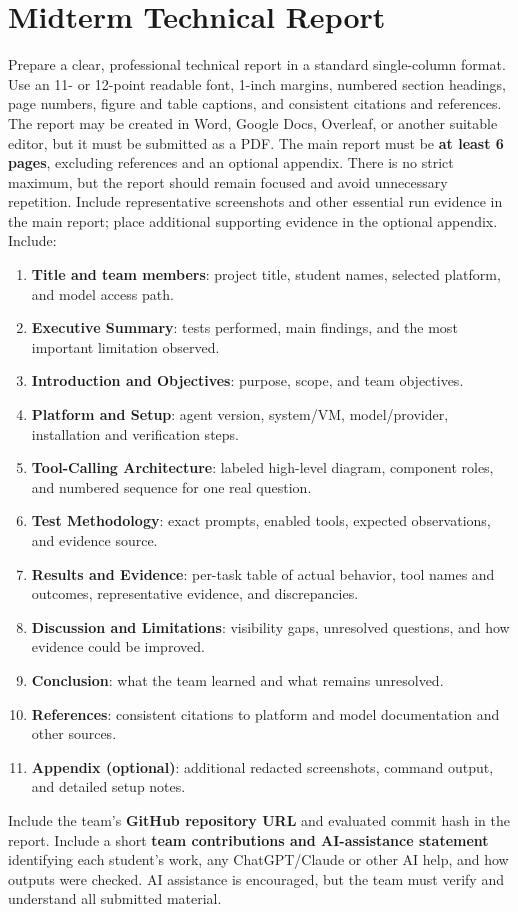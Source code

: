 \documentclass[11pt]{article}
\begin{document}
\section{Midterm Technical Report}
Prepare a clear, professional technical report in a standard single-column format. Use an 11- or 12-point readable font, 1-inch margins, numbered section headings, page numbers, figure and table captions, and consistent citations and references. The report may be created in Word, Google Docs, Overleaf, or another suitable editor, but it must be submitted as a PDF. The main report must be \textbf{at least 6 pages}, excluding references and an optional appendix. There is no strict maximum, but the report should remain focused and avoid unnecessary repetition. Include representative screenshots and other essential run evidence in the main report; place additional supporting evidence in the optional appendix. Include:
\begin{enumerate}
  \item \textbf{Title and team members}: project title, student names, selected platform, and model access path.
  \item \textbf{Executive Summary}: tests performed, main findings, and the most important limitation observed.
  \item \textbf{Introduction and Objectives}: purpose, scope, and team objectives.
  \item \textbf{Platform and Setup}: agent version, system/VM, model/provider, installation and verification steps.
  \item \textbf{Tool-Calling Architecture}: labeled high-level diagram, component roles, and numbered sequence for one real question.
  \item \textbf{Test Methodology}: exact prompts, enabled tools, expected observations, and evidence source.
  \item \textbf{Results and Evidence}: per-task table of actual behavior, tool names and outcomes, representative evidence, and discrepancies.
  \item \textbf{Discussion and Limitations}: visibility gaps, unresolved questions, and how evidence could be improved.
  \item \textbf{Conclusion}: what the team learned and what remains unresolved.
  \item \textbf{References}: consistent citations to platform and model documentation and other sources.
  \item \textbf{Appendix (optional)}: additional redacted screenshots, command output, and detailed setup notes.
\end{enumerate}
Include the team's \textbf{GitHub repository URL} and evaluated commit hash in the report. Include a short \textbf{team contributions and AI-assistance statement} identifying each student's work, any ChatGPT/Claude or other AI help, and how outputs were checked. AI assistance is encouraged, but the team must verify and understand all submitted material.
\end{document}

